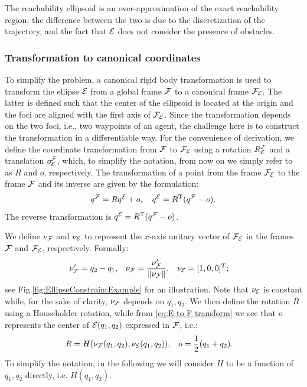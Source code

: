 \documentclass[journal]{IEEEtran}  %
\begin{document}
The reachability ellipsoid is an over-approximation of the exact reachability region; the difference between the two is due to the discretization of the trajectory, and the fact that $\mathcal{E}$ does not consider the presence of obstacles.
\subsubsection{Transformation to canonical coordinates}\label{sec:rotation2Standard}
  To simplify the problem, a canonical rigid body transformation is used to transform the ellipse $\mathcal{E}$ from a global frame $\mathcal{F}$ to a canonical frame $\mathcal{F}_{\mathcal{E}}$. The latter is defined such that the center of the ellipsoid is located at the origin and the foci are aligned with the first axis of $\mathcal{F}_{\mathcal{E}}$. Since the transformation depends on the two foci, i.e., two waypoints of an agent, the challenge here is to construct the transformation in a differentiable way.
  For the convenience of derivation, we define the coordinate transformation from $\mathcal{F}$ to $\mathcal{F}_{\mathcal{E}}$ using a rotation $R^{\mathcal{F}}_{\mathcal{E}}$ and a translation $o^{\mathcal{F}}_{\mathcal{E}}$, which, to simplify the notation, from now on we simply refer to as $R$ and $o$, respectively. The transformation of a point from the frame $\mathcal{F}_{\mathcal{E}}$ to the frame $\mathcal{F}$ and its inverse are given by the formulation:
  \begin{equation}
    {q^{\mathcal{F}}}=R{q^{\mathcal{E}}}+o,\label{eq:E to F transform}\quad
    {q^{\mathcal{E}}}=R^\mathrm{T}({q^{\mathcal{F}}}-o).
  \end{equation}
  The reverse transformation is ${q^{\mathcal{E}}}=R^\mathrm{T}( {q^{\mathcal{F}}}-o)$.

  We define $\nu_{\mathcal{F}}$ and $\nu_{\mathcal{E}}$ to represent the $x$-axis unitary vector of $\mathcal{F}_{\mathcal{E}}$ in the frames $\mathcal{F}$ and $\mathcal{F}_{\mathcal{E}}$, respectively. Formally:
  \begin{align}
    \nu'_{\mathcal{F}}&=q_2-q_1, & \nu_{\mathcal{F}} &= \frac{\nu'_{\mathcal{F}}}{\lVert\nu_{\mathcal{F}}\rVert}, & \nu_{\mathcal{E}}&=[1,0,0]^T;
  \end{align}
  see Fig.\ref{fig:EllipseConstraintExample} for an illustration. Note that $\nu_{\mathcal{E}}$ is constant while, for the sake of clarity, $\nu_{\mathcal{F}}$ depends on $q_1,q_2$. We then define the rotation $R$ using a Householder rotation, while from \eqref{eq:E to F transform} we see that $o$ represents the center of $\mathcal{E}(q_1,q_2)$ expressed in $\mathcal{F}$, i.e.:
  \begin{align}
    R&=H(\nu_{\mathcal{F}}(q_1,q_2),\nu_{\mathcal{E}}(q_1,q_2)), &o&=\frac{1}{2}(q_1+q_2).
  \end{align}
  To simplify the notation, in the following we will consider $H$ to be a function of $q_1,q_2$ directly, i.e. $H(q_1,q_2)$.
\end{document}
